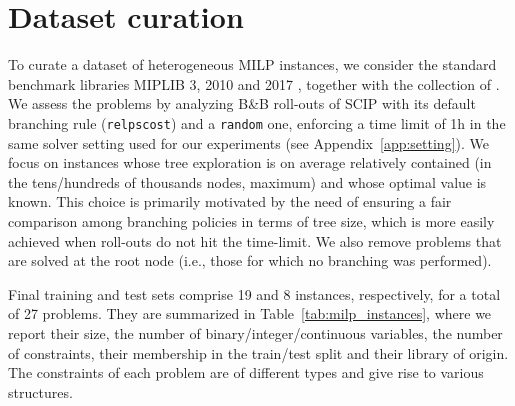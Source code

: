 \documentclass[letterpaper]{article} %
\begin{document}
\small



\appendix



\section{Dataset curation}
\label{app:dataset}

To curate a dataset of heterogeneous MILP instances, we consider the standard benchmark libraries MIPLIB 3, 2010 and 2017 \cite{miplib3,MIPLIB2010,miplib2017}, together with the collection of \citeauthor{milplib}. We assess the problems by analyzing B\&B roll-outs of SCIP with its default branching rule (\texttt{relpscost}) and a \texttt{random} one, enforcing a time limit of 1h in the same solver setting used for our experiments (see Appendix~\ref{app:setting}).
We focus on instances whose tree exploration is on average relatively contained (in the tens/hundreds of thousands nodes, maximum) and whose optimal value is known. This choice is primarily motivated by the need of ensuring a fair comparison among branching policies in terms of tree size, which is more easily achieved when roll-outs do not hit the time-limit. We also remove problems that are solved at the root node (i.e., those for which no branching was performed).

Final training and test sets comprise 19 and 8 instances, respectively, for a total of 27 problems. They are summarized in Table~\ref{tab:milp_instances}, where we report their size, the number of binary/integer/continuous variables, the number of constraints, their membership in the train/test split and their library of origin. The constraints of each problem are of different types and give rise to various structures.
\end{document}
